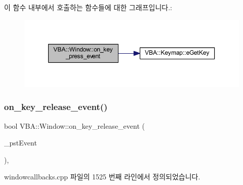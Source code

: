 이 함수 내부에서 호출하는 함수들에 대한 그래프입니다.\+:
\nopagebreak
\begin{figure}[H]
\begin{center}
\leavevmode
\includegraphics[width=350pt]{class_v_b_a_1_1_window_a3fc2f454d5b9bbb8a74d44c3ac10655d_cgraph}
\end{center}
\end{figure}
\mbox{\label{class_v_b_a_1_1_window_af7c7628164d393dd278503b1d95298fa}} 
\subsubsection{\texorpdfstring{on\+\_\+key\+\_\+release\+\_\+event()}{on\_key\_release\_event()}}
{\footnotesize\ttfamily bool V\+B\+A\+::\+Window\+::on\+\_\+key\+\_\+release\+\_\+event (\begin{DoxyParamCaption}\item[{Gdk\+Event\+Key $\ast$}]{\+\_\+pst\+Event }\end{DoxyParamCaption})\hspace{0.3cm}{\ttfamily [protected]}, {\ttfamily [virtual]}}



windowcallbacks.\+cpp 파일의 1525 번째 라인에서 정의되었습니다.


